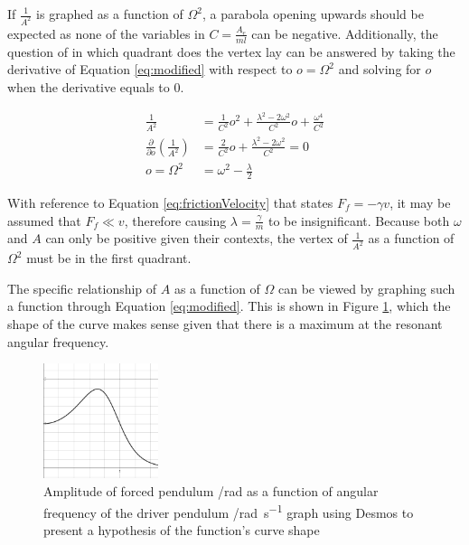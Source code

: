 \documentclass[letterpaper, 12pt]{article}
\begin{document}
If \(\frac{1}{A^2}\) is graphed as a function of \(\Omega^2\),
a parabola opening upwards should be expected as
none of the variables in
\(C = \frac{A_e}{ml}\) can be negative. Additionally,
the question of in which quadrant does the vertex lay can
be answered by taking the derivative of Equation \ref*{eq:modified}
with respect to \(o = \Omega^2\) and solving for \(o\) when
the derivative equals to 0.

\begin{align*}
    \frac{1}{A^2}                                           & = \frac{1}{C^2}o^2+ \frac{\lambda^2 - 2\omega^2}{C^2}o + \frac{\omega^4}{C^2}
    \\
    \frac{\partial}{\partial o}\left( \frac{1}{A^2} \right) & = \frac{2}{C^2}o + \frac{\lambda^2 - 2\omega^2}{C^2} = 0
    \\
    o = \Omega^2                                            & = \omega^2 - \frac{\lambda}{2}
\end{align*}

With reference to Equation \ref*{eq:frictionVelocity} that states
\(F_f = -\gamma v\), it may be assumed that \(F_f \ll v\),
therefore causing \(\lambda = \frac{\gamma}{m}\) to be
insignificant. Because both \(\omega\) and \(A\) can only
be positive given their contexts, the vertex of
\(\frac{1}{A^2}\) as a function of \(\Omega^2\)
must be in the first quadrant.

The specific relationship of \(A\) as a function of \(\Omega\)
can be viewed by graphing such a function through
Equation \ref*{eq:modified}. This is shown in Figure
\ref*{fig:hypothesis}, which the shape of the curve
makes sense given that there is a maximum
at the resonant angular frequency.

\begin{figure}[H]
    \centering
    \includegraphics[width=0.3\textwidth]{hypothesis.png}
    \caption{Amplitude of forced pendulum /\unit{rad} as a function of angular frequency of the driver pendulum /\unit{rad.s^{-1}} graph using Desmos to present a hypothesis of the function's curve shape}
    \label{fig:hypothesis}
\end{figure}
\end{document}
